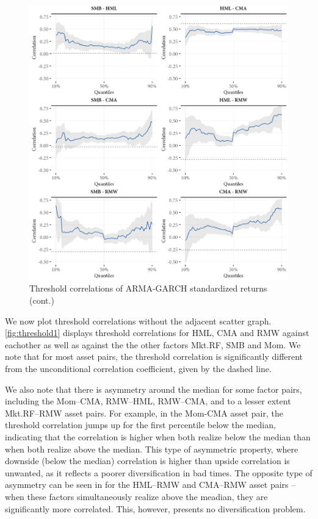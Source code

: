 \begin{figure}[!ht]
  \ContinuedFloat
  \centering

  \includegraphics[scale=1]{graphics/threshold2.png}

  \caption{Threshold correlations of ARMA-GARCH standardized returns (cont.)}
\end{figure}

We now plot threshold correlations without the adjacent scatter graph. \autoref{fig:threshold1} displays threshold correlations for HML, CMA and RMW against eachother as well as against the the other factors Mkt.RF, SMB and Mom. We note that for most asset pairs, the threshold correlation is significantly different from the unconditional correlation coefficient, given by the dashed line.

We also note that there is asymmetry around the median for some factor pairs, including the Mom--CMA, RMW--HML, RMW--CMA, and to a lesser extent Mkt.RF--RMW asset pairs. For example, in the Mom-CMA asset pair, the threshold correlation jumps up for the first percentile below the median, indicating that the correlation is higher when both realize below the median than when both realize above the median. This type of asymmetric property, where downside (below the median) correlation is higher than upside correlation is unwanted, as it reflects a poorer diversification in bad times. The opposite type of asymmetry can be seen in for the HML--RMW and CMA--RMW asset pairs -- when these factors simultaneously realize above the meadian, they are significantly more correlated. This, however, presents no diversification problem.

